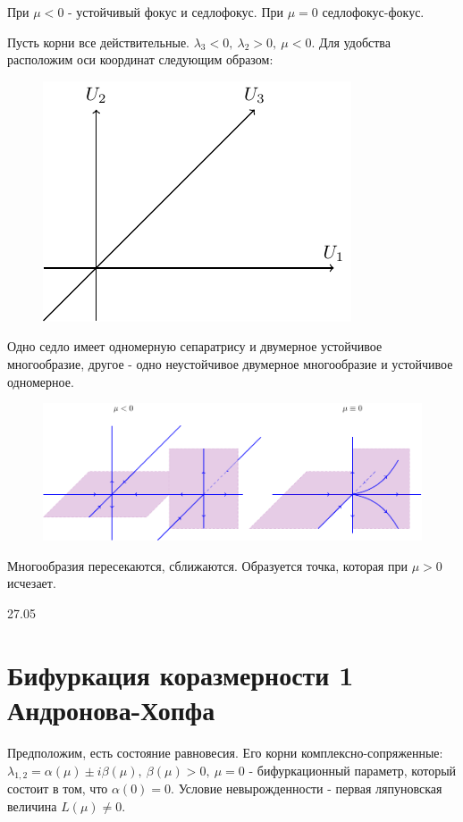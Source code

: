 При $\mu<0$ - устойчивый фокус и седлофокус. При $\mu=0$ седлофокус-фокус.

Пусть корни все действительные. $\lambda_3<0,~\lambda_2>0,~\mu<0$. Для удобства расположим оси координат следующим образом:
\begin{figure} 
	\vspace{0.1em}
	\centering
	\includegraphics[scale=1]{fig/fig51.pdf}
	\vspace{-0.25em}
\end{figure}

Одно седло имеет одномерную сепаратрису и двумерное устойчивое многообразие, другое - одно неустойчивое двумерное многообразие и устойчивое одномерное.

\begin{figure}[H]
	\centering
	\includegraphics[width=1\linewidth]{fig/fig52.pdf}   
\end{figure}

Многообразия пересекаются, сближаются. Образуется точка, которая при $\mu>0$ исчезает.

27.05
\section{Бифуркация коразмерности 1 Андронова-Хопфа}
Предположим, есть состояние равновесия. Его корни комплексно-сопряженные: $\lambda_{1,2}=\alpha(\mu)\pm i \beta(\mu),~\beta(\mu)>0,~\mu=0$ - бифуркационный параметр, который состоит в том, что $\alpha(0)=0$. Условие невырожденности - первая ляпуновская величина $L(\mu)\neq 0$.

